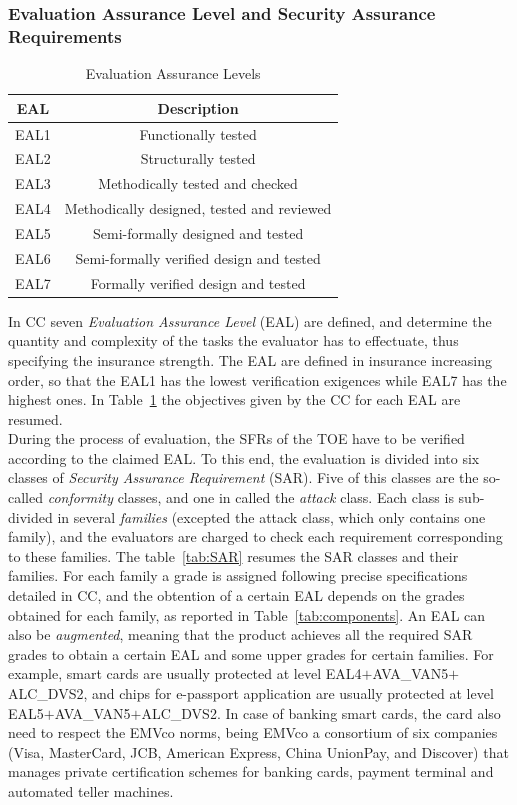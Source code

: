 \subsubsection{Evaluation Assurance Level and Security Assurance Requirements}
\begin{table}[]
\centering
\caption{Evaluation Assurance Levels}
\label{tab:EAL}
\begin{tabular}{cc}
\toprule 
EAL  & Description                                \\
\midrule
EAL1 & Functionally tested                        \\
EAL2 & Structurally tested                        \\
EAL3 & Methodically tested and checked            \\
EAL4 & Methodically designed, tested and reviewed \\
EAL5 & Semi-formally designed and tested          \\
EAL6 & Semi-formally verified design and tested   \\
EAL7 & Formally verified design and tested      \\
\bottomrule
\end{tabular}
\end{table}

In CC seven  \emph{Evaluation Assurance Level} (EAL) are defined, and determine the quantity and complexity of the tasks the evaluator has to effectuate, thus specifying the insurance strength. The EAL are defined in insurance increasing order, so that the EAL1 has the lowest verification exigences while EAL7 has the highest ones. In Table~\ref{tab:EAL} the objectives given by the CC for each EAL are resumed.\\

During the process of evaluation, the SFRs of the TOE have to be verified according to the claimed EAL. To this end, the evaluation is  divided into six classes of \emph{Security Assurance Requirement} (SAR). Five of this classes are the so-called \emph{conformity} classes, and one in called the \emph{attack} class. Each class is sub-divided in several \emph{families} (excepted the attack class, which only contains one family), and the evaluators are charged to check each requirement corresponding to these families. The table~\ref{tab:SAR} resumes the SAR classes and their families. For each family a grade is assigned following precise specifications detailed in CC, and the obtention of a certain EAL depends on the grades obtained for each family, as reported in Table~\ref{tab:components}. An EAL can also be \emph{augmented}, meaning that the product achieves all the required SAR grades to obtain a certain EAL and some upper grades for certain families. For example, smart cards are usually protected at level EAL4$+$AVA\_VAN5$+$ALC\_DVS2, and chips for e-passport application are usually protected at level EAL5$+$AVA\_VAN5$+$ALC\_DVS2. In case of banking smart cards, the card also need to respect the EMVco norms, being EMVco a consortium of six companies (Visa, MasterCard, JCB, American Express, China UnionPay, and Discover) that manages private certification schemes for banking cards, payment terminal and automated teller machines. 


